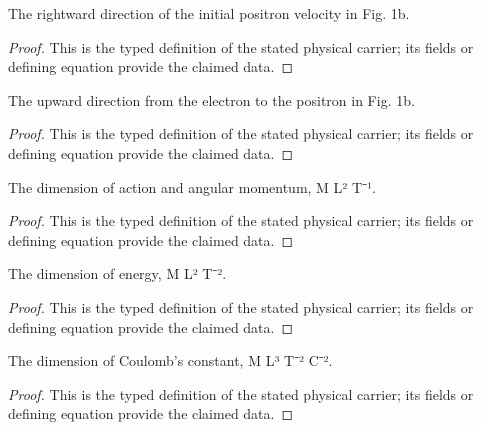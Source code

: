 \begin{definition}
  \label{def:physics:IPhO_2026_1_B_2:aux002}
  The rightward direction of the initial positron velocity in Fig. 1b.
\end{definition}
\begin{proof}
  This is the typed definition of the stated physical carrier; its fields or defining equation provide the claimed data.
\end{proof}

\begin{definition}
  \label{def:physics:IPhO_2026_1_B_2:aux003}
  The upward direction from the electron to the positron in Fig. 1b.
\end{definition}
\begin{proof}
  This is the typed definition of the stated physical carrier; its fields or defining equation provide the claimed data.
\end{proof}

\begin{definition}
  \label{def:physics:IPhO_2026_1_B_2:aux004}
  The dimension of action and angular momentum, M L² T⁻¹.
\end{definition}
\begin{proof}
  This is the typed definition of the stated physical carrier; its fields or defining equation provide the claimed data.
\end{proof}

\begin{definition}
  \label{def:physics:IPhO_2026_1_B_2:aux005}
  The dimension of energy, M L² T⁻².
\end{definition}
\begin{proof}
  This is the typed definition of the stated physical carrier; its fields or defining equation provide the claimed data.
\end{proof}

\begin{definition}
  \label{def:physics:IPhO_2026_1_B_2:aux006}
  The dimension of Coulomb's constant, M L³ T⁻² C⁻².
\end{definition}
\begin{proof}
  This is the typed definition of the stated physical carrier; its fields or defining equation provide the claimed data.
\end{proof}

